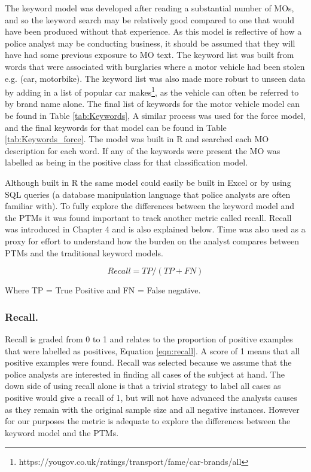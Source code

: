 The keyword model was developed after reading a substantial number of MOs, and so the keyword search may be relatively good compared to one that would have been produced without that experience. As this model is reflective of how a police analyst may be conducting business, it should be assumed that they will have had some previous exposure to MO text. The keyword list was built from words that were associated with burglaries where a motor vehicle had been stolen e.g. (car, motorbike). The keyword list was also made more robust to unseen data by adding in a list of popular car makes\footnote{https://yougov.co.uk/ratings/transport/fame/car-brands/all}, as the vehicle can often be referred to by brand name alone. The final list of keywords for the motor vehicle model can be found in Table \ref{tab:Keywords}, A similar process was used for the force model, and the final keywords for that model can be found in Table \ref{tab:Keywords_force}. The model was built in R and searched each MO description for each word. If any of the keywords were present the MO was labelled as being in the positive class for that classification model.

Although built in R the same model could easily be built in Excel or by using SQL queries (a database manipulation language that police analysts are often familiar with). To fully explore the differences between the keyword model and the PTMs it was found important to track another metric called recall. Recall was introduced in Chapter 4 and is also explained below. Time was also used as a proxy for effort to understand how the burden on the analyst compares between PTMs and the traditional keyword models.

\begin{equation}
 Recall = TP / (TP + FN)
 \label{eqn:recall}
\end{equation}

Where TP = True Positive and FN = False negative.
\subsubsection{Recall.} Recall is graded from 0 to 1 and relates to the proportion of positive examples that were labelled as positives, Equation \ref{eqn:recall}. A score of 1 means that all positive examples were found. Recall was selected because we assume that the police analysts are interested in finding all cases of the subject at hand. The down side of using recall alone is that a trivial strategy to label all cases as positive would give a recall of 1, but will not have advanced the analysts causes as they remain with the original sample size and all negative instances. However for our purposes the metric is adequate to explore the differences between the keyword model and the PTMs.


